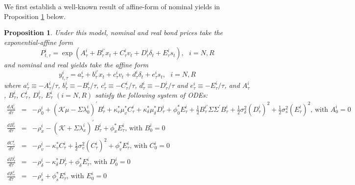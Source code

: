 \documentclass{article}
\newtheorem{proposition}[theorem]{Proposition}
\begin{document}
We first establish a well-known result of affine-form of nominal yields in
Proposition \ref{prop_yields} below.

\begin{proposition}
\label{prop_yields}Under this model, nominal and real bond prices take the
exponential-affine form%
\begin{equation}
P_{t,\tau }^{i}=\exp \left( A_{\tau }^{i}+B_{\tau }^{i\prime }x_{t}+C_{\tau
}^{i}v_{t}+D_{\tau }^{i}\delta _{t}+E_{\tau }^{i}s_{t}\right) ,\text{ }i=N,R
\end{equation}%
and nominal and real yields take the affine form%
\begin{equation}
y_{t,\tau }^{i}=a_{\tau }^{i}+b_{\tau }^{i\prime }x_{t}+c_{\tau
}^{i}v_{t}+d_{\tau }^{i}\delta _{t}+e_{\tau }^{i}s_{t},\text{ }i=N,R
\end{equation}%
where $a_{\tau }^{i}\equiv -A_{\tau }^{i}/\tau $, $b_{\tau }^{i}\equiv
-B_{\tau }^{i}/\tau $, $c_{\tau }^{i}\equiv -C_{\tau }^{i}/\tau $, $d_{\tau
}^{i}\equiv -D_{\tau }^{i}/\tau $ and $e_{\tau }^{i}\equiv -E_{\tau
}^{i}/\tau $, and $A_{\tau }^{i}$, $B_{\tau }^{i}$, $C_{\tau }^{i}$, $%
D_{\tau }^{i}$, $E_{\tau }^{i}$ $(i=N,R)$ satisfy the following system of
ODEs:%
\begin{eqnarray*}
\frac{dA_{\tau }^{i}}{d\tau } &=&-\rho _{0}^{i}+\left( \mathcal{K\mu }%
-\Sigma \lambda _{0}^{i}\right) ^{\prime }B_{\tau }^{i}+\kappa _{v}^{\ast
}\mu _{v}^{\ast }C_{\tau }^{i}+\kappa _{\delta }^{\ast }\mu _{\delta }^{\ast
}D_{\tau }^{i}+\phi _{0}^{\ast }E_{\tau }^{i}+\frac{1}{2}B_{\tau }^{i\prime
}\Sigma \Sigma ^{\prime }B_{\tau }^{i}+\frac{1}{2}\sigma _{\delta
}^{2}\left( D_{\tau }^{i}\right) ^{2}+\frac{1}{2}\sigma _{s}^{2}\left(
E_{\tau }^{i}\right) ^{2}\text{, with }A_{0}^{i}=0 \\
\frac{dB_{\tau }^{i}}{d\tau } &=&-\rho _{x}^{i}-\left( \mathcal{K}+\Sigma
\lambda _{x}^{i}\right) ^{\prime }B_{\tau }^{i}+\phi _{x}^{\ast }E_{\tau
}^{i}\text{, with }B_{0}^{i}=0 \\
\frac{dC_{\tau }^{i}}{d\tau } &=&-\rho _{v}^{i}-\kappa _{v}^{\ast }C_{\tau
}^{i}+\frac{1}{2}\sigma _{v}^{2}\left( C_{\tau }^{i}\right) ^{2}+\phi
_{v}^{\ast }E_{\tau }^{i}\text{, with }C_{0}^{i}=0 \\
\frac{dD_{\tau }^{i}}{d\tau } &=&-\rho _{\delta }^{i}-\kappa _{\delta
}^{\ast }D_{\tau }^{i}+\phi _{\delta }^{\ast }E_{\tau }^{i}\text{, with }%
D_{0}^{i}=0 \\
\frac{dE_{\tau }^{i}}{d\tau } &=&-\rho _{s}^{i}+\phi _{s}^{\ast }E_{\tau
}^{i}\text{, with }E_{0}^{i}=0
\end{eqnarray*}
\end{proposition}
\end{document}
